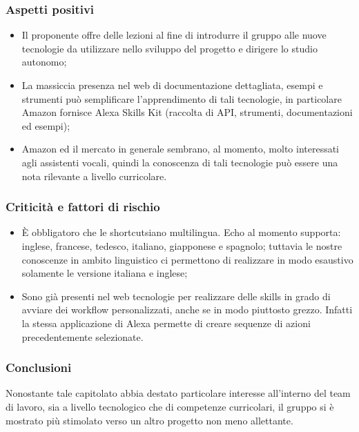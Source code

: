 \subsubsection{Aspetti positivi}
\begin{itemize}
    \item Il proponente offre delle lezioni al fine di introdurre il gruppo alle 
nuove tecnologie da utilizzare nello sviluppo del progetto e dirigere lo studio 
autonomo;
    \item La massiccia presenza nel web di documentazione dettagliata, esempi e 
strumenti può semplificare l'apprendimento di tali tecnologie, in 
particolare Amazon fornisce Alexa Skills Kit (raccolta di API, 
strumenti, documentazioni ed esempi);
    \item Amazon ed il mercato in generale sembrano, al momento, molto interessati 
agli assistenti vocali, quindi la conoscenza di tali tecnologie può essere una 
nota rilevante a livello curricolare.
\end{itemize}
\subsubsection{Criticità e fattori di rischio}
\begin{itemize}
    \item \`E obbligatoro che le shortcut\glosp siano multilingua. Echo al momento 
supporta: inglese, francese, tedesco, italiano, giapponese e spagnolo; tuttavia 
le nostre conoscenze in ambito linguistico ci permettono di realizzare in modo 
esaustivo solamente le versione italiana e inglese;
    \item Sono già presenti nel web tecnologie per realizzare delle skills\glo{} in 
    grado di avviare dei workflow\glo{} personalizzati, anche se in modo piuttosto grezzo.
    Infatti la stessa applicazione di Alexa permette di creare sequenze di azioni precedentemente 
selezionate.
 
\end{itemize}
\subsubsection{Conclusioni}
Nonostante tale capitolato abbia destato particolare interesse all'interno del 
team di lavoro, sia a livello tecnologico che di competenze curricolari, il 
gruppo si è mostrato più stimolato verso un altro progetto non meno allettante.


